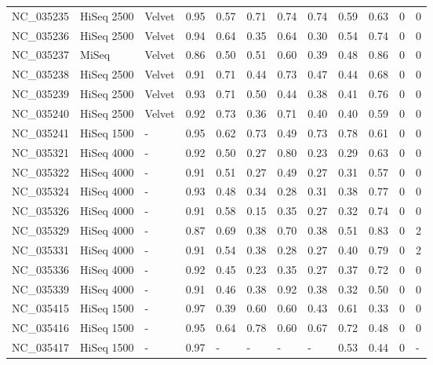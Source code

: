 \begin{table}[ht]
\begin{tabular}{llllllllllll}
  NC\_035235 & HiSeq 2500 & Velvet & 0.95 & 0.57 & 0.71 & 0.74 & 0.74 & 0.59 & 0.63 &   0 &     0 \\ 
  NC\_035236 & HiSeq 2500 & Velvet & 0.94 & 0.64 & 0.35 & 0.64 & 0.30 & 0.54 & 0.74 &   0 &     0 \\ 
  NC\_035237 & MiSeq & Velvet & 0.86 & 0.50 & 0.51 & 0.60 & 0.39 & 0.48 & 0.86 &   0 &     0 \\ 
  NC\_035238 & HiSeq 2500 & Velvet & 0.91 & 0.71 & 0.44 & 0.73 & 0.47 & 0.44 & 0.68 &   0 &     0 \\ 
  NC\_035239 & HiSeq 2500 & Velvet & 0.93 & 0.71 & 0.50 & 0.44 & 0.38 & 0.41 & 0.76 &   0 &     0 \\ 
  NC\_035240 & HiSeq 2500 & Velvet & 0.92 & 0.73 & 0.36 & 0.71 & 0.40 & 0.40 & 0.59 &   0 &     0 \\ 
  NC\_035241 & HiSeq 1500 & - & 0.95 & 0.62 & 0.73 & 0.49 & 0.73 & 0.78 & 0.61 &   0 &     0 \\ 
  NC\_035321 & HiSeq 4000 & - & 0.92 & 0.50 & 0.27 & 0.80 & 0.23 & 0.29 & 0.63 &   0 &     0 \\ 
  NC\_035322 & HiSeq 4000 & - & 0.91 & 0.51 & 0.27 & 0.49 & 0.27 & 0.31 & 0.57 &   0 &     0 \\ 
  NC\_035324 & HiSeq 4000 & - & 0.93 & 0.48 & 0.34 & 0.28 & 0.31 & 0.38 & 0.77 &   0 &     0 \\ 
  NC\_035326 & HiSeq 4000 & - & 0.91 & 0.58 & 0.15 & 0.35 & 0.27 & 0.32 & 0.74 &   0 &     0 \\ 
  NC\_035329 & HiSeq 4000 & - & 0.87 & 0.69 & 0.38 & 0.70 & 0.38 & 0.51 & 0.83 &   0 &     2 \\ 
  NC\_035331 & HiSeq 4000 & - & 0.91 & 0.54 & 0.38 & 0.28 & 0.27 & 0.40 & 0.79 &   0 &     2 \\ 
  NC\_035336 & HiSeq 4000 & - & 0.92 & 0.45 & 0.23 & 0.35 & 0.27 & 0.37 & 0.72 &   0 &     0 \\ 
  NC\_035339 & HiSeq 4000 & - & 0.91 & 0.46 & 0.38 & 0.92 & 0.38 & 0.32 & 0.50 &   0 &     0 \\ 
  NC\_035415 & HiSeq 1500 & - & 0.97 & 0.39 & 0.60 & 0.60 & 0.43 & 0.61 & 0.33 &   0 &     0 \\ 
  NC\_035416 & HiSeq 1500 & - & 0.95 & 0.64 & 0.78 & 0.60 & 0.67 & 0.72 & 0.48 &   0 &     0 \\ 
  NC\_035417 & HiSeq 1500 & - & 0.97 & - & - & - & - & 0.53 & 0.44 &   0 & - \\ 
   \hline
\end{tabular}
\end{table}
